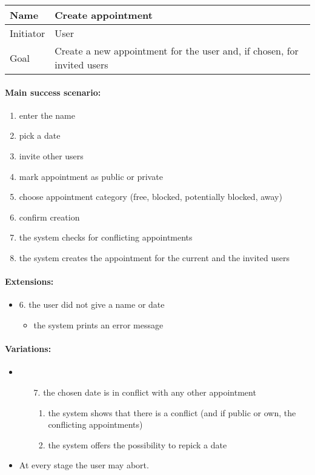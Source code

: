 \documentclass[a4paper]{scrartcl}
\begin{document}
\begin{tabular}{|g|l|}
	\hline
Name &  Create appointment \\
	\hline
Initiator &  User \\
	\hline
Goal &  Create a new appointment for the user and, if chosen, for invited users \\
	\hline
\end{tabular}

\paragraph{Main success scenario:}
\begin{enumerate}
	\item enter the name
	\item pick a date
	\item invite other users
	\item mark appointment as public or private
	\item choose appointment category (free, blocked, potentially blocked, away)
	\item confirm creation
	\item the system checks for conflicting appointments
	\item the system creates the appointment for the current and the invited users
\end{enumerate}

\paragraph{Extensions:}
\begin{itemize}
	\item 6. the user did not give a name or date
		\begin{itemize}
			\item the system prints an error message
		\end{itemize}
\end{itemize}

\paragraph{Variations:}
\begin{itemize}
	\item 
		\begin{enumerate}
			\item[7.] the chosen date is in conflict with any other appointment
				\begin{enumerate}
					\item the system shows that there is a conflict (and if public or own, the conflicting appointments)
					\item the system offers the possibility to repick a date
				\end{enumerate}
		\end{enumerate}
	\item At every stage the user may abort.
\end{itemize}
\end{document}
